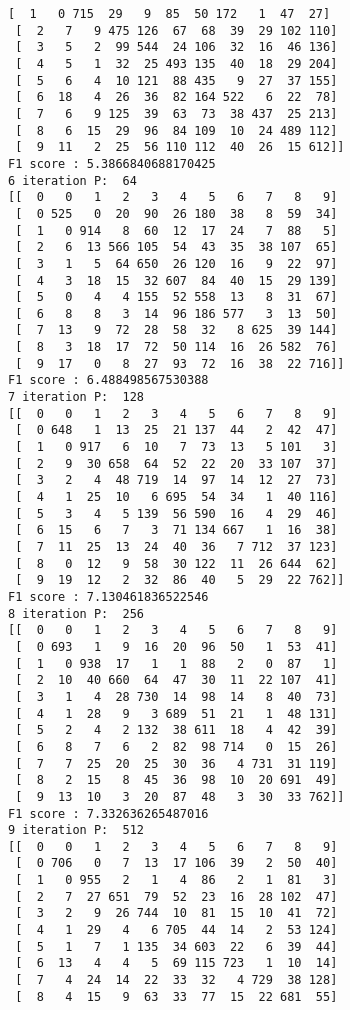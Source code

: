 \documentclass[11pt]{article}
\begin{document}
\begin{Verbatim}[commandchars=\\\{\}]
 [  1   0 715  29   9  85  50 172   1  47  27]
 [  2   7   9 475 126  67  68  39  29 102 110]
 [  3   5   2  99 544  24 106  32  16  46 136]
 [  4   5   1  32  25 493 135  40  18  29 204]
 [  5   6   4  10 121  88 435   9  27  37 155]
 [  6  18   4  26  36  82 164 522   6  22  78]
 [  7   6   9 125  39  63  73  38 437  25 213]
 [  8   6  15  29  96  84 109  10  24 489 112]
 [  9  11   2  25  56 110 112  40  26  15 612]]
F1 score : 5.3866840688170425
6 iteration P:  64
[[  0   0   1   2   3   4   5   6   7   8   9]
 [  0 525   0  20  90  26 180  38   8  59  34]
 [  1   0 914   8  60  12  17  24   7  88   5]
 [  2   6  13 566 105  54  43  35  38 107  65]
 [  3   1   5  64 650  26 120  16   9  22  97]
 [  4   3  18  15  32 607  84  40  15  29 139]
 [  5   0   4   4 155  52 558  13   8  31  67]
 [  6   8   8   3  14  96 186 577   3  13  50]
 [  7  13   9  72  28  58  32   8 625  39 144]
 [  8   3  18  17  72  50 114  16  26 582  76]
 [  9  17   0   8  27  93  72  16  38  22 716]]
F1 score : 6.488498567530388
7 iteration P:  128
[[  0   0   1   2   3   4   5   6   7   8   9]
 [  0 648   1  13  25  21 137  44   2  42  47]
 [  1   0 917   6  10   7  73  13   5 101   3]
 [  2   9  30 658  64  52  22  20  33 107  37]
 [  3   2   4  48 719  14  97  14  12  27  73]
 [  4   1  25  10   6 695  54  34   1  40 116]
 [  5   3   4   5 139  56 590  16   4  29  46]
 [  6  15   6   7   3  71 134 667   1  16  38]
 [  7  11  25  13  24  40  36   7 712  37 123]
 [  8   0  12   9  58  30 122  11  26 644  62]
 [  9  19  12   2  32  86  40   5  29  22 762]]
F1 score : 7.130461836522546
8 iteration P:  256
[[  0   0   1   2   3   4   5   6   7   8   9]
 [  0 693   1   9  16  20  96  50   1  53  41]
 [  1   0 938  17   1   1  88   2   0  87   1]
 [  2  10  40 660  64  47  30  11  22 107  41]
 [  3   1   4  28 730  14  98  14   8  40  73]
 [  4   1  28   9   3 689  51  21   1  48 131]
 [  5   2   4   2 132  38 611  18   4  42  39]
 [  6   8   7   6   2  82  98 714   0  15  26]
 [  7   7  25  20  25  30  36   4 731  31 119]
 [  8   2  15   8  45  36  98  10  20 691  49]
 [  9  13  10   3  20  87  48   3  30  33 762]]
F1 score : 7.332636265487016
9 iteration P:  512
[[  0   0   1   2   3   4   5   6   7   8   9]
 [  0 706   0   7  13  17 106  39   2  50  40]
 [  1   0 955   2   1   4  86   2   1  81   3]
 [  2   7  27 651  79  52  23  16  28 102  47]
 [  3   2   9  26 744  10  81  15  10  41  72]
 [  4   1  29   4   6 705  44  14   2  53 124]
 [  5   1   7   1 135  34 603  22   6  39  44]
 [  6  13   4   4   5  69 115 723   1  10  14]
 [  7   4  24  14  22  33  32   4 729  38 128]
 [  8   4  15   9  63  33  77  15  22 681  55]

\end{Verbatim}
\end{document}
